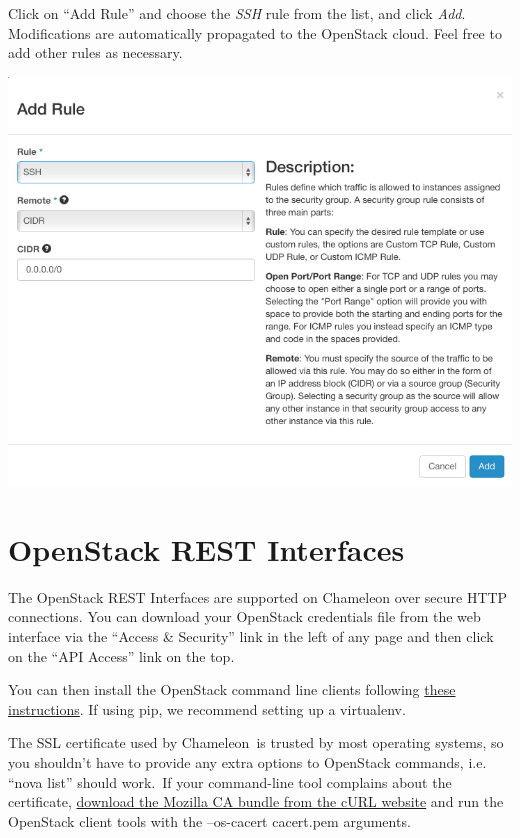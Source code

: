 Click on ``Add Rule'' and choose the \emph{SSH} rule from the list, and
click \emph{Add}. Modifications are automatically propagated to the
OpenStack cloud. Feel free to add other rules as necessary.

\includegraphics[width=\columnwidth]{images/chameleon/openstack_alamo_add_secgroup_rule.png}

\section{OpenStack REST Interfaces}\label{openstack-rest-interfaces}

The OpenStack REST Interfaces are supported on Chameleon over secure
HTTP connections. You can download your OpenStack credentials file from
the web interface via the ``Access \& Security'' link in the left of any
page and then click on the ``API Access'' link on the top.

You can then install the OpenStack command line clients following
\href{http://docs.openstack.org/user-guide/common/cli_install_openstack_command_line_clients.html}{these
instructions}. If using pip, we recommend setting up a virtualenv.

The SSL certificate used by Chameleon~is trusted by most operating
systems, so you shouldn't have to provide any extra options to OpenStack
commands, i.e. ``nova list'' should work.~If your command-line tool
complains about the certificate,
\href{http://curl.haxx.se/docs/caextract.html}{download the Mozilla CA
bundle from the cURL website} and run the OpenStack client tools with
the --os-cacert cacert.pem arguments.

